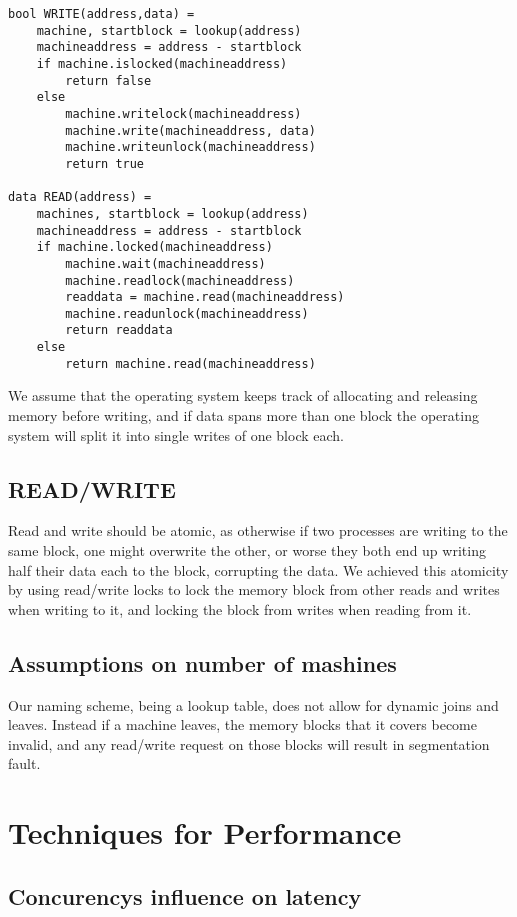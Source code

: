 \documentclass{article}
\theoremstyle{plain}
\theoremstyle{nonumberplain}
\begin{document}
\begin{lstlisting}
bool WRITE(address,data) =
	machine, startblock = lookup(address)
	machineaddress = address - startblock
	if machine.islocked(machineaddress)
		return false
	else
		machine.writelock(machineaddress)
		machine.write(machineaddress, data)
		machine.writeunlock(machineaddress)
		return true
	
data READ(address) = 
	machines, startblock = lookup(address)
	machineaddress = address - startblock
	if machine.locked(machineaddress)
		machine.wait(machineaddress)
		machine.readlock(machineaddress)
		readdata = machine.read(machineaddress)
		machine.readunlock(machineaddress)
		return readdata
	else
		return machine.read(machineaddress)
\end{lstlisting}
We assume that the operating system keeps track of allocating and releasing memory before writing, and if data spans more than one block the operating system will split it into single writes of one block each.

\subsection{READ/WRITE}
Read and write should be atomic, as otherwise if two processes are writing to the same block, one might overwrite the other, or worse they both end up writing half their data each to the block, corrupting the data. We achieved this atomicity by using read/write locks to lock the memory block from other reads and writes when writing to it, and locking the block from writes when reading from it.


\subsection{Assumptions on number of mashines}
Our naming scheme, being a lookup table, does not allow for dynamic joins and leaves. Instead if a machine leaves, the memory blocks that it covers become invalid, and any read/write request on those blocks will result in segmentation fault. 

\section{Techniques for Performance}

\subsection{Concurencys influence on latency}
\end{document}
